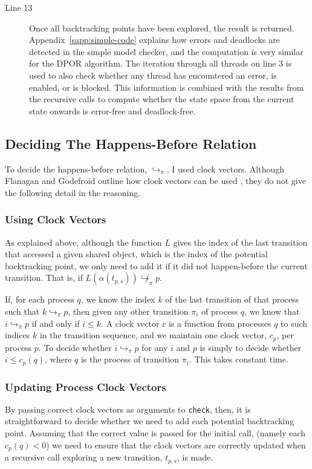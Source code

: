 \documentclass[12pt,a4paper,twoside,openany]{report}
\begin{document}
\begin{description}
	\item[Line 13] Once all backtracking points have been
	explored, the result is returned.
	Appendix~\ref{sapp:simple-code} explains
	how errors and deadlocks are
	detected in the simple model checker,
	and the computation is very similar
	for the DPOR algorithm. The iteration
	through all threads on line 3 is used
	to also check whether any thread has
	encountered an error, is enabled,
	or is blocked.
	This information is combined with the
	results from the recursive calls to
	compute whether the state space from
	the current state onwards is error-free
	and deadlock-free.

\end{description}

\subsection{Deciding The Happens-Before Relation}
\label{sec:clock-vectors}

To decide the happens-before relation,
$\hookrightarrow_\pi$, I used clock vectors.
Although Flanagan
and Godefroid outline how clock vectors
can be used \cite{flan05},
they do not give the
following detail in the
reasoning.

\subsubsection{Using Clock Vectors}

As explained above, although
the function $L$ gives the index
of the last transition that accessed a given shared
object, which is the index of the potential backtracking
point, we only need to add it if it
did not happen-before the current transition.
That is, if
$L(\alpha(t_{p,s})) \not\hookrightarrow_\pi p$.

If, for each process
$q$, we know the index $k$ of the last transition of that
process such that $k \hookrightarrow_\pi p$,
then given any other transition $\pi_i$ of
process $q$, we know that
$i \hookrightarrow_\pi p$ if and only if
$i \leq k$. A clock vector $c$ is
a function from processes $q$ to such
indices $k$ in the transition sequence,
and we maintain one clock vector, $c_p$, per
process $p$. To decide whether
$i \hookrightarrow_\pi p$ for
any $i$ and $p$ is simply to decide
whether $i \leq c_p(q)$, where $q$ is
the process of transition $\pi_i$.
This takes constant time.

\subsubsection{Updating Process Clock Vectors}
By passing correct clock vectors as arguments to
\texttt{check}, then, it is straightforward
to decide whether we need to add each potential
backtracking point.
Assuming that the correct value is passed for
the initial call,
(namely each $c_p(q) < 0$)
we need to ensure that the
clock vectors are correctly updated when
a recursive call exploring a new transition,
$t_{p,s}$, is made.
\end{document}

